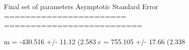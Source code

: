 Final set of parameters            Asymptotic Standard Error
=======================            ==========================

m               = -430.516         +/- 11.12        (2.583%
c               = 755.105          +/- 17.66        (2.338%

